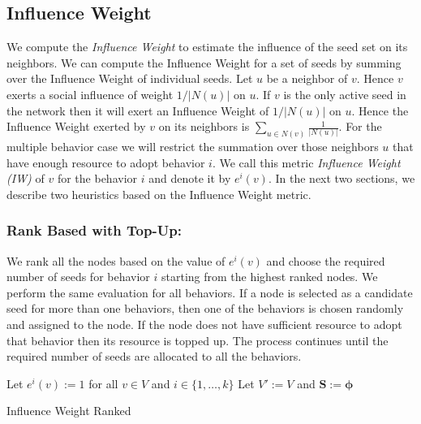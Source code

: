 \documentclass[letterpaper]{article}
\theoremstyle{plain} 		\newtheorem{thm}{Theorem}[section]
\theoremstyle{definition} 	\newtheorem{defn}[thm]{Definition}
\theoremstyle{remark}		\newtheorem{rem}{Remark}
\begin{document}
\subsection{Influence Weight}
We compute the \textit{Influence Weight} to estimate the influence of the seed set on its neighbors.  We can compute the Influence Weight for a set of seeds by summing over the Influence Weight of individual seeds.  Let $u$ be a neighbor of $v$. Hence $v$ exerts a social influence of weight $1/|N(u)|$ on $u$. If $v$ is the only active seed in the network then it will exert an Influence Weight of  $1/|N(u)|$ on $u$. Hence the Influence Weight exerted by $v$ on its neighbors is $\scriptstyle \sum_{u \in N(v)} \frac{1}{|N(u)|}$. For the multiple behavior case we will restrict the summation over those neighbors $u$ that have enough resource to adopt behavior $i$. We call this metric \textit{Influence Weight (IW)} of $v$ for the behavior $i$ and denote it by $e^i(v)$. In the next two sections, we describe two heuristics based on the Influence Weight  metric. 
 
\subsubsection{Rank Based with Top-Up:} We rank all the nodes based on the value of $e^i(v)$ and choose the required number of seeds for behavior $i$ starting from the highest ranked nodes. We perform the same evaluation for all behaviors. If a node is selected as a candidate seed for more than one behaviors, then one of the behaviors is chosen randomly and assigned to the node. If the node does not have sufficient resource to adopt that behavior then its resource is topped up. The process continues until the required number of seeds are allocated to all the behaviors.

\begin{algorithm}[t]
\SetAlgoNoLine
{}
Let $e^i(v):=1$ for all $v\in V$ and $i \in \{1,\ldots,k\}$\;
Let $V':=V$ and $\mathbf{S:=}\boldsymbol{\phi}$\;
\caption{Influence Weight  Ranked}
\label{algo:ond-step-ranked}
\end{algorithm}
\end{document}
